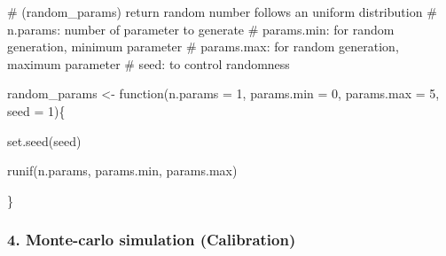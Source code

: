 \documentclass[
  a4paper,
  DIV=11,
  numbers=noendperiod]{scrreprt}
\newenvironment{Shaded}{\begin{snugshade}}{\end{snugshade}}
\newcommand{\AttributeTok}[1]{\textcolor[rgb]{0.40,0.45,0.13}{#1}}
\newcommand{\CommentTok}[1]{\textcolor[rgb]{0.37,0.37,0.37}{#1}}
\newcommand{\ControlFlowTok}[1]{\textcolor[rgb]{0.00,0.23,0.31}{#1}}
\newcommand{\DecValTok}[1]{\textcolor[rgb]{0.68,0.00,0.00}{#1}}
\newcommand{\FunctionTok}[1]{\textcolor[rgb]{0.28,0.35,0.67}{#1}}
\newcommand{\NormalTok}[1]{\textcolor[rgb]{0.00,0.23,0.31}{#1}}
\newcommand{\OtherTok}[1]{\textcolor[rgb]{0.00,0.23,0.31}{#1}}
\begin{document}
\begin{Shaded}
\begin{Highlighting}[]
\CommentTok{\# (random\_params) return random number follows an uniform distribution}
\CommentTok{\# n.params: number of parameter to generate }
\CommentTok{\# params.min: for random generation, minimum parameter}
\CommentTok{\# params.max: for random generation, maximum parameter}
\CommentTok{\# seed: to control randomness }

\NormalTok{random\_params }\OtherTok{\textless{}{-}} \ControlFlowTok{function}\NormalTok{(}\AttributeTok{n.params =} \DecValTok{1}\NormalTok{, }\AttributeTok{params.min =} \DecValTok{0}\NormalTok{, }\AttributeTok{params.max =} \DecValTok{5}\NormalTok{, }\AttributeTok{seed =} \DecValTok{1}\NormalTok{)\{}
  
  \FunctionTok{set.seed}\NormalTok{(seed)}
  
  \FunctionTok{runif}\NormalTok{(n.params, params.min, params.max)}
  
\NormalTok{\}}
\end{Highlighting}
\end{Shaded}

\subsubsection*{4. Monte-carlo simulation
(Calibration)}\label{monte-carlo-simulation-calibration}
\end{document}
